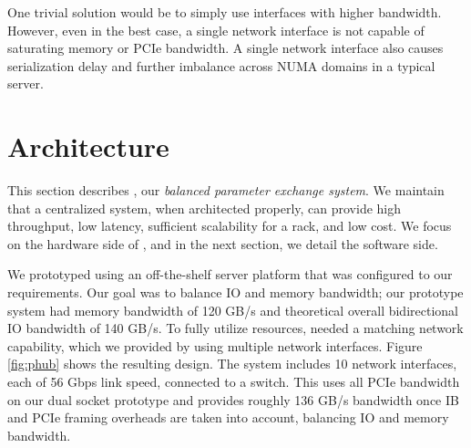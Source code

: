 
One trivial solution would be to simply use interfaces with higher bandwidth. However, even in the best case, a single network interface is not capable of saturating memory or PCIe bandwidth. A single network interface also causes serialization delay and further imbalance across NUMA domains in a typical server. %



\section{\pbox Architecture}
This section describes \pbox, our \textit{balanced parameter exchange system}. We maintain that a centralized system, when architected properly, can provide high throughput, low latency, sufficient scalability for a rack, and low cost. We focus on the hardware side of \pbox, and in the next section, we detail the software side.

We prototyped \pbox using an off-the-shelf server platform that was configured to our requirements. Our goal was to balance IO and memory bandwidth; our prototype system had memory bandwidth of 120 GB/s and theoretical overall bidirectional IO bandwidth of 140 GB/s. To fully utilize resources, \pbox needed a matching network capability, which we provided by using multiple network interfaces. Figure \ref{fig:phub} shows the resulting \pbox design. The system includes 10 network interfaces, each of 56 Gbps link speed, connected to a switch. This uses all PCIe bandwidth on our dual socket prototype and provides roughly 136 GB/s bandwidth once IB and PCIe framing overheads are taken into account, balancing IO and memory bandwidth.

